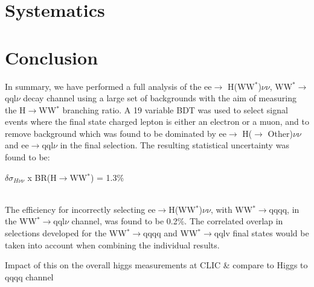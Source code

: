 \section{Systematics}
\label{higgsSystematics}

\section{Conclusion}

In summary, we have performed a full analysis of the ee$\rightarrow$ H(WW$^*$)$\nu\nu$, WW$^*\rightarrow$qql$\nu$ decay channel using a large set of backgrounds with the aim of measuring the H$\rightarrow$WW$^*$ branching ratio. A 19 variable BDT was used to select signal events where the final state charged lepton is either an electron or a muon, and to remove background which was found to be dominated by ee$\rightarrow$ H($\rightarrow$ Other)$\nu\nu$  and ee$\rightarrow$qql$\nu$ in the final selection. The resulting statistical uncertainty was found to be: \\[10pt]\centerline{\large{$\delta\sigma_{H\nu\nu}$ x BR(H$\rightarrow$WW$^*$) = 1.3\%}} \\[10pt] The efficiency for incorrectly selecting ee$\rightarrow$H(WW$^*$)$\nu\nu$, with WW$^*\rightarrow$qqqq, in the WW$^*\rightarrow$qql$\nu$ channel, was found to be 0.2\%. The correlated overlap in selections developed for the WW$^*\rightarrow$qqqq and WW$^*\rightarrow$qqlv final states would be taken into account when combining the individual results.



Impact of this on the overall higgs measurements at CLIC \& compare to Higgs to qqqq channel
